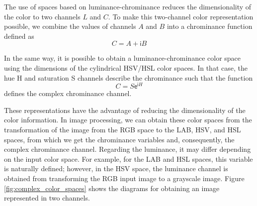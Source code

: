 \documentclass[journal]{IEEEtran}
\begin{document}
The use of spaces based on luminance-chrominance reduces the dimensionality of the color to two channels $L$ and $C$. To make this two-channel color representation possible, we combine the values of channels $A$ and $B$ into a chrominance function defined as
\begin{equation}\label{eq:chrominance_lab}
    C = A + \mathsf{i}B
\end{equation}

In the same way, it is possible to obtain a luminance-chrominance color space using the dimensions of the cylindrical HSV/HSL color spaces. In that case, the hue H and saturation S channels describe the chrominance such that the function
\begin{equation}\label{eq:chrominance_hsv}
    C = S \mathsf{e}^{\mathsf{i}H}
\end{equation}
defines the complex chrominance channel.

These representations have the advantage of reducing the dimensionality of the color information. In image processing, we can obtain these color spaces from the transformation of the image from the RGB space to the LAB, HSV, and HSL spaces, from which we get the chrominance variables and, consequently, the complex chrominance channel. Regarding the luminance, it may differ depending on the input color space. For example, for the LAB and HSL spaces, this variable is naturally defined; however, in the HSV space, the luminance channel is obtained from transforming the RGB input image to a grayscale image. Figure \ref{fig:complex_color_spaces} shows the diagrams for obtaining an image represented in two channels.
\end{document}
